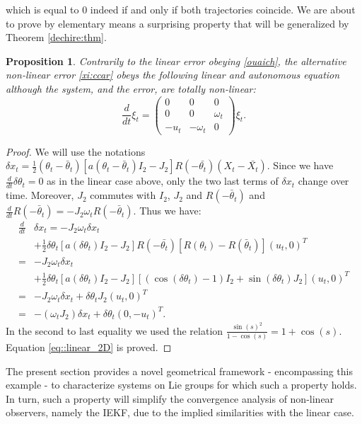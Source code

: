 \documentclass[a4paper,12pt,onecolumn]{article}
\newtheorem{prop}{Proposition}
\newcommand{\dotex}{{\frac{d}{dt}}}
\begin{document}
which is equal to 0 indeed if and only if both trajectories coincide. We are about to prove by elementary means a surprising property that will be generalized by Theorem \ref{dechire:thm}.
\begin{prop}Contrarily to the linear error obeying  \eqref{ouaich}, the alternative non-linear error \eqref{xi:ccar} obeys the following  \emph{linear} and autonomous equation although the system, and the error, are totally non-linear:
\begin{equation}
\frac{d}{dt} \xi_t = \begin{pmatrix} 0 & 0 & 0 \\ 0 & 0 & \omega_t \\ -u_t & -\omega_t & 0 \end{pmatrix} \xi_t.
\label{eq::linear_2D}
\end{equation}
\end{prop}
\begin{proof}
We will use the notations   $\delta x_t = \frac{1}{2} \left( \theta_t - \bar \theta_t \right) \left[ a(\theta_t - \bar \theta_t ) I_2 - J_2 \right] R(-\bar{\theta_t})(X_t-\bar{X_t})$. Since we have  $\frac{d}{dt} \delta \theta_t=0$ as in the linear case above, only the two last terms of $\delta x_t$ change over time. Moreover, $J_2$ commutes with $I_2$, $J_2$ and $R(-\bar \theta_t)$ and $\dotex R(-\bar\theta_t)=-J_2\omega_tR(-\bar\theta_t)$. Thus we have:
\begin{align*}
 \frac{d}{dt} & \delta x_t = -J_2 \omega_t \delta x_t \\
 & +  \frac{1}{2} \delta \theta_t \left[ a(\delta \theta_t ) I_2 - J_2 \right] R(-\bar{\theta_t}) \left[ R(\theta_t) -R( \bar \theta_t) \right] (u_t , 0)^T \\
 = & -J_2 \omega_t \delta x_t \\
 & +  \frac{1}{2} \delta \theta_t \left[ a(\delta \theta_t ) I_2 - J_2 \right] \left[ (\cos(\delta \theta_t)-1) I_2 + \sin(\delta \theta_t) J_2  \right] (u_t , 0)^T \\
 = & - J_2\omega_t  \delta x_t +   \delta \theta_t J_2 (u_t , 0)^T \\
 = & -(\omega_t J_2)  \delta x_t +   \delta \theta_t (0 , -u_t)^T.
\end{align*}
In the second to last equality we used the relation $\frac{\sin(s)^2}{1-\cos(s)} = 1+ \cos(s) $. Equation \eqref{eq::linear_2D} is proved.
\end{proof}
 The present section provides a novel geometrical framework - encompassing this example - to characterize systems on Lie groups for which such a property holds. In turn, such a property will simplify the convergence analysis of non-linear observers, namely the IEKF,  due to the implied similarities with the linear case. 
\end{document}
